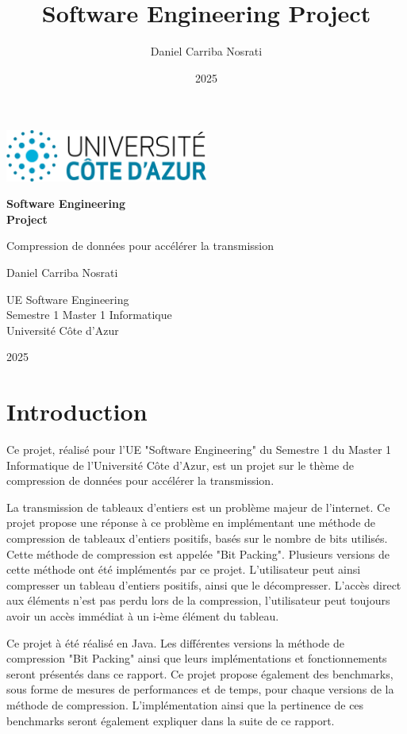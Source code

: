 \documentclass[titlepage]{article}
\title{Software Engineering Project}
\author{Daniel \sc Carriba Nosrati}
\date{2025}
\begin{document}
\begin{titlepage}
    \centering
    \vspace*{\fill}
    {\includegraphics[width=0.5\textwidth]{img/unice-logo.png} \par}
    \vfill
    {\Huge \bfseries Software Engineering\\Project \par}
    \vspace{1cm}
    {\Large Compression de données pour accélérer la transmission \par}
    \vfill
    {\Large Daniel \sc Carriba Nosrati \par}
    \vspace{0.5cm}
    {\large UE Software Engineering\\Semestre 1 Master 1 Informatique\\Université Côte d'Azur \par}
    \vspace{0.5cm}
    {\large 2025 \par}
    \vspace*{\fill} 
\end{titlepage}

\tableofcontents

\clearpage

\section{Introduction}

Ce projet, réalisé pour l'UE "Software Engineering" du Semestre 1 du Master 1 Informatique de l'Université Côte d'Azur, est un projet sur le thème de compression de données pour accélérer la transmission.
\par La transmission de tableaux d'entiers est un problème majeur de l'internet. Ce projet propose une réponse à ce problème en implémentant une méthode de compression de tableaux d'entiers positifs, basés sur le nombre de bits utilisés. Cette méthode de compression est appelée "Bit Packing". Plusieurs versions de cette méthode ont été implémentés par ce projet. L'utilisateur peut ainsi compresser un tableau d'entiers positifs, ainsi que le décompresser. L'accès direct aux éléments n'est pas perdu lors de la compression, l'utilisateur peut toujours avoir un accès immédiat à un i-ème élément du tableau.
\par Ce projet à été réalisé en Java. Les différentes versions la méthode de compression "Bit Packing" ainsi que leurs implémentations et fonctionnements seront présentés dans ce rapport. Ce projet propose également des benchmarks, sous forme de mesures de performances et de temps, pour chaque versions de la méthode de compression. L'implémentation ainsi que la pertinence de ces benchmarks seront également expliquer dans la suite de ce rapport.
\end{document}
